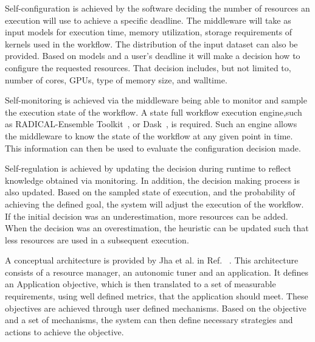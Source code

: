 Self-configuration is achieved by the software deciding the number of 
resources an execution will use to achieve a specific deadline. The 
middleware will take as input models for execution time, memory utilization, 
storage requirements of kernels used in the workflow. The distribution of the 
input dataset can also be provided. Based on models and a user's deadline it 
will make a decision how to configure the requested resources. That decision 
includes, but not limited to, number of cores, GPUs, type of memory size, and 
walltime.

Self-monitoring is achieved via the middleware being able to monitor and 
sample the execution state of the workflow. A state full workflow execution 
engine,such as RADICAL-Ensemble Toolkit~\cite{balasubramanian2018harnessing}, 
or Dask~\cite{rocklin2015dask}, is required. Such an engine allows the 
middleware to know the state of the workflow at any given point in time. This 
information can then be used to evaluate the configuration decision made.

Self-regulation is achieved by updating the decision during runtime to 
reflect knowledge obtained via monitoring. In addition, the decision making 
process is also updated. Based on the sampled state of execution, and the 
probability of achieving the defined goal, the system will adjust the 
execution of the workflow. If the initial decision was an underestimation, 
more resources can be added. When the decision was an overestimation, the 
heuristic can be updated such that less resources are used in a subsequent 
execution.


A conceptual architecture is provided by Jha et al. in Ref.~\cite{jha2009self}
. This architecture consists of a resource manager, an autonomic tuner and an 
application. It defines an Application objective, which is then translated to 
a set of measurable requirements, using well defined metrics, that the 
application should meet. These objectives are achieved through user defined 
mechanisms. Based on the objective and a set of mechanisms, the system can 
then define necessary strategies and actions to achieve the objective.


